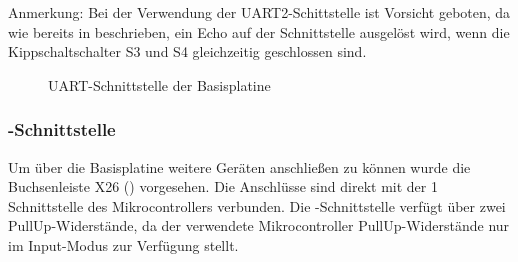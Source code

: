 \begin{warning}
    Anmerkung: Bei der Verwendung der UART2-Schittstelle ist Vorsicht geboten, da wie bereits in  beschrieben, ein Echo auf der Schnittstelle ausgelöst wird, wenn die Kippschaltschalter S3 und S4 gleichzeitig geschlossen sind.
\end{warning}

\begin{figure}[H]
    \centering
    \qquad
    \qquad
    \caption[UART-Schnittstelle der Basisplatine]{UART-Schnittstelle der \gls{Basisplatine}}
    \label{fig:basisplatine-uart}
\end{figure}

\subsubsection{\IIC{}-Schnittstelle}
Um über die \gls{Basisplatine} weitere \IIC{} Geräten anschließen zu können wurde die Buchsenleiste X26 () vorgesehen. Die Anschlüsse sind direkt mit der \IIC{}1 Schnittstelle des Mikrocontrollers verbunden. Die \IIC{}-Schnittstelle verfügt über zwei PullUp-Widerstände, da der verwendete Mikrocontroller PullUp-Widerstände nur im Input-Modus zur Verfügung stellt.

